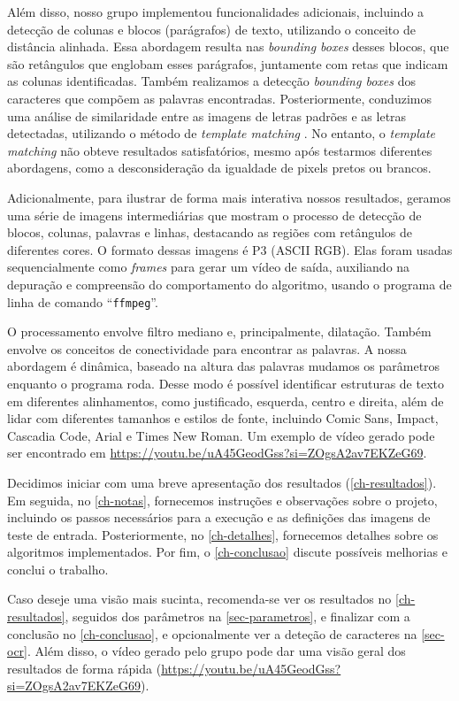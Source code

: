 \documentclass[english, 
               brazil, 
               bsc] %
               {dcomp-abntex2}
\begin{document}
Além disso, nosso grupo implementou funcionalidades adicionais, incluindo a detecção de colunas e blocos (parágrafos) de texto, utilizando o conceito de distância alinhada. Essa abordagem resulta nas \textit{bounding boxes} desses blocos, que são retângulos que englobam esses parágrafos, juntamente com retas que indicam as colunas identificadas. Também realizamos a detecção \textit{bounding boxes} dos caracteres que compõem as palavras encontradas. Posteriormente, conduzimos uma análise de similaridade entre as imagens de letras padrões e as letras detectadas, utilizando o método de \textit{template matching} \cite[12.2]{gonzalez2008digital}. No entanto, o \textit{template matching} não obteve resultados satisfatórios, mesmo após testarmos diferentes abordagens, como a desconsideração da igualdade de pixels pretos ou brancos.


Adicionalmente, para ilustrar de forma mais interativa nossos resultados, geramos uma série de imagens intermediárias que mostram o processo de detecção de blocos, colunas, palavras e linhas, destacando as regiões com retângulos de diferentes cores. O formato dessas imagens é P3 (ASCII RGB). Elas foram usadas sequencialmente como \textit{frames} para gerar um vídeo de saída, auxiliando na depuração e compreensão do comportamento do algoritmo, usando o programa de linha de comando ``\texttt{ffmpeg}''.


O processamento envolve filtro mediano e, principalmente, dilatação. Também envolve os conceitos de conectividade para encontrar as palavras. A nossa abordagem é dinâmica, baseado na altura das palavras mudamos os parâmetros enquanto o programa roda. Desse modo é possível identificar estruturas de texto em diferentes alinhamentos, como justificado, esquerda, centro e direita, além de lidar com diferentes tamanhos e estilos de fonte, incluindo Comic Sans, Impact, Cascadia Code, Arial e Times New Roman. Um exemplo de vídeo gerado pode ser encontrado em \url{https://youtu.be/uA45GeodGss?si=ZOgsA2av7EKZeG69}.


Decidimos iniciar com uma breve apresentação dos resultados (\autoref{ch-resultados}). Em seguida, no \autoref{ch-notas}, fornecemos instruções e observações sobre o projeto, incluindo os passos necessários para a execução e as definições das imagens de teste de entrada. Posteriormente, no \autoref{ch-detalhes}, fornecemos detalhes sobre os algoritmos implementados. Por fim, o \autoref{ch-conclusao} discute possíveis melhorias e conclui o trabalho.


Caso deseje uma visão mais sucinta, recomenda-se ver os resultados no \autoref{ch-resultados}, seguidos dos parâmetros na \autoref{sec-parametros}, e finalizar com a conclusão no \autoref{ch-conclusao}, e opcionalmente ver a deteção de caracteres na \autoref{sec-ocr}. Além disso, o vídeo gerado pelo grupo pode dar uma visão geral dos resultados de forma rápida (\url{https://youtu.be/uA45GeodGss?si=ZOgsA2av7EKZeG69}).
\end{document}
